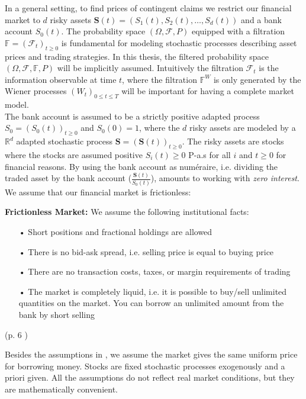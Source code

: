 In a general setting, to find prices of contingent claims we restrict our financial market to $d$ risky assets $\bm{S}(t)=(S_1(t), S_2(t),\ldots, S_d(t))$ and a bank account $S_0(t)$. The probability space $(\Omega, \mathcal{F}, P)$ equipped with a filtration $\mathbb{F}=(\mathcal{F}_t)_{t\geq 0}$ is fundamental for modeling stochastic processes describing asset prices and trading strategies. In this thesis, the filtered probability space $(\Omega, \mathcal{F}, \mathbb{F}, P)$ will be implicitly assumed. Intuitively the filtration $\mathcal{F}_t$ is the information observable at time $t$, where the filtration $\mathbb{F}^{W}$ is only generated by the Wiener processes $(W_t)_{0\leq t \leq T}$ will be important for having a complete market model.\\

The bank account is assumed to be a strictly positive adapted process $S_0=(S_0 (t))_{t \geq 0}$ and $S_0(0)=1$, where the $d$ risky assets are modeled by a $\mathbb{R}^d$ adapted stochastic process $\bm{S}=(\bm{S}(t))_{t\geq 0}$. The risky assets are stocks where the stocks are assumed positive $S_i(t)\geq 0$ P-a.s for all $i$ and $t\geq 0$ for financial reasons. By using the bank account as numéraire, i.e. dividing the traded asset by the bank account ($\frac{\bm{S}(t)}{S_0 (t)}$), amounts to working with \textit{zero interest}. We assume that our financial market is frictionless:
\theoremstyle{assumption}
\begin{assumption}{\textbf{Frictionless Market: }}\label{EfficientMarket}
We assume the following institutional facts:
\begin{enumerate}
\item[•] Short positions and fractional holdings are allowed
\item[•] There is no bid-ask spread, i.e. selling price is equal to buying price
\item[•] There are no transaction costs, taxes, or margin requirements of trading
\item[•] The market is completely liquid, i.e. it is possible to buy/sell unlimited quantities on the market. You can borrow an unlimited amount from the bank by short selling
\end{enumerate}
\hfill (p. 6 \parencite{finKont})
\end{assumption}
Besides the assumptions in \parencite{finKont}, we assume the market gives the same uniform price for borrowing money. Stocks are fixed stochastic processes exogenously and a priori given. All the assumptions do not reflect real market conditions, but they are mathematically convenient.


